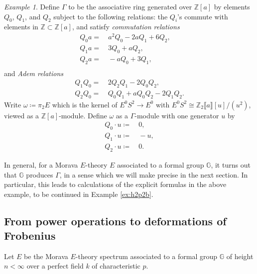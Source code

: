 \documentclass{gtpart}
\theoremstyle{definition}
\theoremstyle{remark}
\newtheorem{ex}[thm]{Example}
\newcommand{\mb}[1]{\mathbb{#1}}
\newcommand{\BG}{{\mb G}}
\newcommand{\BZ}{{\mb Z}}
\newcommand{\G}{\Gamma}
\newcommand{\ce}{\coloneqq}
\numberwithin{equation}{section}
\numberwithin{thm}{section}
\begin{document}
\begin{ex}
\label{ex:h2p2a}
 Define $\G$ to be the associative ring generated over $\BZ [a]$ by 
 elements $Q_0$, $Q_1$, and $Q_2$ subject to the following relations: 
 the $Q_i$'s commute with elements in $\BZ \subset \BZ [a]$, and satisfy 
 {\em commutation relations} 
 \begin{equation*}
 \begin{split}
  Q_0 a = & ~ a^2 Q_0 - 2 a Q_1 + 6 Q_2, \quad ~ \\
  Q_1 a = & ~ 3 Q_0 + a Q_2, \\
  Q_2 a = & ~ -a Q_0 + 3 Q_1, \\
 \end{split}
 \end{equation*}
 and {\em Adem relations} 
 \begin{equation*}
 \begin{split}
  Q_1Q_0 = & ~ 2 Q_2Q_1 - 2 Q_0Q_2, \\
  Q_2Q_0 = & ~ Q_0Q_1 + a Q_0Q_2 - 2 Q_1Q_2.  
 \end{split}
 \end{equation*}
 Write $\omega \ce \pi_2 E$ which is the kernel of $E^0 S^2 \to E^0$ 
 with $E^0 S^2 \cong \BZ_2 \llbracket a \rrbracket [u] / (u^2)$, viewed 
 as a $\BZ [a]$-module.  Define $\omega$ as a $\G$-module with one 
 generator $u$ by 
 \begin{equation*}
 \begin{split}
  Q_0 \cdot u \ce & ~ 0, \\
  Q_1 \cdot u \ce & ~ -u, \\
  Q_2 \cdot u \ce & ~ 0.  
 \end{split}
 \end{equation*}
\end{ex}

In general, for a Morava $E$-theory $E$ associated to a formal group 
$\BG$, it turns out that $\BG$ produces $\G$, in a sense which we will 
make precise in the next section.  In particular, this leads to 
calculations of the explicit formulas in the above example, to be 
continued in Example \ref{ex:h2p2b}.  


\subsection{From power operations to deformations of Frobenius}
\label{subsec:bridge}

Let $E$ be the Morava $E$-theory spectrum associated to a formal group 
$\BG$ of height $n<\infty$ over a perfect field $k$ of characteristic 
$p$.  
\end{document}
